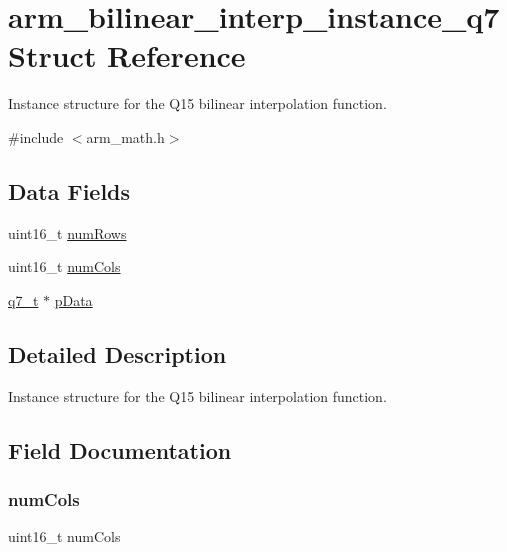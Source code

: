 \hypertarget{structarm__bilinear__interp__instance__q7}{}\section{arm\+\_\+bilinear\+\_\+interp\+\_\+instance\+\_\+q7 Struct Reference}
\label{structarm__bilinear__interp__instance__q7}


Instance structure for the Q15 bilinear interpolation function.  




{\ttfamily \#include $<$arm\+\_\+math.\+h$>$}

\subsection*{Data Fields}
\begin{DoxyCompactItemize}
\item 
uint16\+\_\+t \mbox{\hyperlink{structarm__bilinear__interp__instance__q7_a1bcf80ccdc2acc29198f1592ae300390}{num\+Rows}}
\item 
uint16\+\_\+t \mbox{\hyperlink{structarm__bilinear__interp__instance__q7_a4bb5ec0d13eb4c9cf887aa8366a44117}{num\+Cols}}
\item 
\mbox{\hyperlink{arm__math_8h_ae541b6f232c305361e9b416fc9eed263}{q7\+\_\+t}} $\ast$ \mbox{\hyperlink{structarm__bilinear__interp__instance__q7_afde7546ea2ec5df9fe42fb04d128a016}{p\+Data}}
\end{DoxyCompactItemize}


\subsection{Detailed Description}
Instance structure for the Q15 bilinear interpolation function. 

\subsection{Field Documentation}
\mbox{\label{structarm__bilinear__interp__instance__q7_a4bb5ec0d13eb4c9cf887aa8366a44117}} 
\subsubsection{\texorpdfstring{numCols}{numCols}}
{\footnotesize\ttfamily uint16\+\_\+t num\+Cols}

